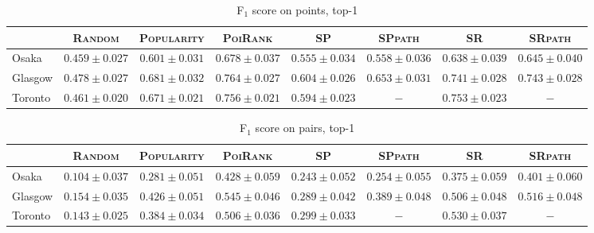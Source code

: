 \begin{table*}[!h]
\caption{F$_1$ score on points, top-1}
\centering
\small
\setlength{\tabcolsep}{4pt} %
\begin{tabular}{l|cc|cc|ccc} \hline
 & \textsc{Random} & \textsc{Popularity} & \textsc{PoiRank} & \textsc{SP} & \textsc{SPpath} & \textsc{SR} & \textsc{SRpath} \\ \hline
Osaka & $0.459\pm0.027$ & $0.601\pm0.031$ & $\mathbf{0.678\pm0.037}$ & $0.555\pm0.034$ & $0.558\pm0.036$ & $0.638\pm0.039$ & $\mathit{0.645\pm0.040}$ \\
Glasgow & $0.478\pm0.027$ & $0.681\pm0.032$ & $\mathbf{0.764\pm0.027}$ & $0.604\pm0.026$ & $0.653\pm0.031$ & $0.741\pm0.028$ & $\mathit{0.743\pm0.028}$ \\
Toronto & $0.461\pm0.020$ & $0.671\pm0.021$ & $\mathbf{0.756\pm0.021}$ & $0.594\pm0.023$ & $-$ & $\mathit{0.753\pm0.023}$ & $-$ \\
\hline
\end{tabular}
\end{table*}

\begin{table*}[!h]
\caption{F$_1$ score on pairs, top-1}
\centering
\small
\setlength{\tabcolsep}{4pt} %
\begin{tabular}{l|cc|cc|ccc} \hline
 & \textsc{Random} & \textsc{Popularity} & \textsc{PoiRank} & \textsc{SP} & \textsc{SPpath} & \textsc{SR} & \textsc{SRpath} \\ \hline
Osaka & $0.104\pm0.037$ & $0.281\pm0.051$ & $\mathbf{0.428\pm0.059}$ & $0.243\pm0.052$ & $0.254\pm0.055$ & $0.375\pm0.059$ & $\mathit{0.401\pm0.060}$ \\
Glasgow & $0.154\pm0.035$ & $0.426\pm0.051$ & $\mathbf{0.545\pm0.046}$ & $0.289\pm0.042$ & $0.389\pm0.048$ & $0.506\pm0.048$ & $\mathit{0.516\pm0.048}$ \\
Toronto & $0.143\pm0.025$ & $0.384\pm0.034$ & $\mathit{0.506\pm0.036}$ & $0.299\pm0.033$ & $-$ & $\mathbf{0.530\pm0.037}$ & $-$ \\
\hline
\end{tabular}
\end{table*}

